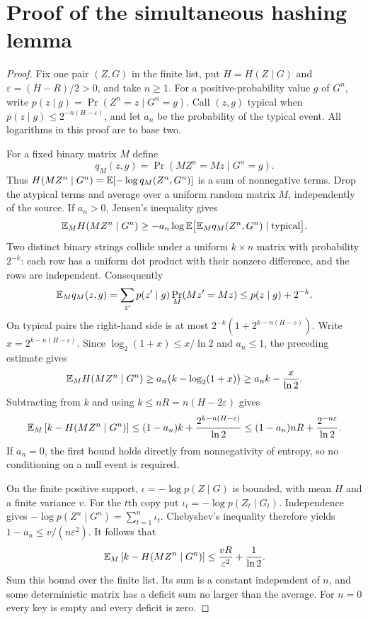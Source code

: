\section{Proof of the simultaneous hashing lemma}\label{app:hash}
\begin{proof}
Fix one pair $(Z,G)$ in the finite list, put $H=H(Z\mid G)$ and
$\varepsilon=(H-R)/2>0$, and take $n\ge1$.
For a positive-probability value $g$ of $G^n$, write
$p(z\mid g)=\Pr(Z^n=z\mid G^n=g)$. Call $(z,g)$ typical when
$p(z\mid g)\le2^{-n(H-\varepsilon)}$, and let $a_n$ be the probability
of the typical event. All logarithms in this proof are to base two.

For a fixed binary matrix $M$ define
\[
 q_M(z,g)=\Pr(MZ^n=Mz\mid G^n=g).
\]
Thus $H(MZ^n\mid G^n)=\mathbb E[-\log q_M(Z^n,G^n)]$ is a sum of nonnegative
terms. Drop the atypical terms and average over a uniform random matrix
$M$, independently of the source. If $a_n>0$, Jensen's inequality gives
\[
 \mathbb E_M H(MZ^n\mid G^n)
 \ge-a_n\log\mathbb E\bigl[\mathbb E_M q_M(Z^n,G^n)\mid\text{typical}\bigr].
\]
Two distinct binary strings collide under a uniform $k\times n$ matrix
with probability $2^{-k}$: each row has a uniform dot product with their
nonzero difference, and the rows are independent. Consequently
\[
 \mathbb E_M q_M(z,g)
 =\sum_{z'}p(z'\mid g)\Pr_M(Mz'=Mz)
 \le p(z\mid g)+2^{-k}.
\]
On typical pairs the right-hand side is at most
$2^{-k}(1+2^{k-n(H-\varepsilon)})$. Write $x=2^{k-n(H-\varepsilon)}$. Since $\log_2(1+x)\le x/\ln2$
and $a_n\le1$, the preceding estimate gives
\[
 \mathbb E_M H(MZ^n\mid G^n)
 \ge a_n\bigl(k-\log_2(1+x)\bigr)
 \ge a_nk-\frac{x}{\ln2}.
\]
Subtracting from $k$ and using $k\le nR=n(H-2\varepsilon)$ gives
\begin{equation}\label{eq:hashbound}
 \mathbb E_M\,[k-H(MZ^n\mid G^n)]
 \le (1-a_n)k+\frac{2^{k-n(H-\varepsilon)}}{\ln2}
 \le (1-a_n)nR+\frac{2^{-n\varepsilon}}{\ln2}.
\end{equation}
If $a_n=0$, the first bound holds directly from nonnegativity of entropy,
so no conditioning on a null event is required.

On the finite positive support, $\iota=-\log p(Z\mid G)$ is bounded,
with mean $H$ and a finite variance $v$. For the $t$th copy put $\iota_t=-\log p(Z_t\mid G_t)$. Independence gives
$-\log p(Z^n\mid G^n)=\sum_{t=1}^n\iota_t$. Chebyshev's inequality
therefore yields $1-a_n\le v/(n\varepsilon^2)$. It follows that
\[
 \mathbb E_M\,[k-H(MZ^n\mid G^n)]\le\frac{vR}{\varepsilon^2}+\frac1{\ln2}.
\]
Sum this bound over the finite list. Its sum is a constant independent of
$n$, and some deterministic matrix has a deficit sum no larger than the
average. For $n=0$ every key is empty and every deficit is zero.
\end{proof}
